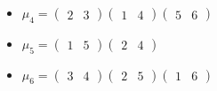 \documentclass{article}
\begin{document}
\begin{enumerate}
\begin{itemize}
            \item $\mu_4=\begin{pmatrix}2&3\end{pmatrix}\begin{pmatrix}1&4\end{pmatrix}\begin{pmatrix}5&6\end{pmatrix}$
            \item $\mu_5=\begin{pmatrix}1&5\end{pmatrix}\begin{pmatrix}2&4\end{pmatrix}$
            \item $\mu_6=\begin{pmatrix}3&4\end{pmatrix}\begin{pmatrix}2&5\end{pmatrix}\begin{pmatrix}1&6\end{pmatrix}$
        \end{itemize}
        

\end{enumerate}
\end{document}
